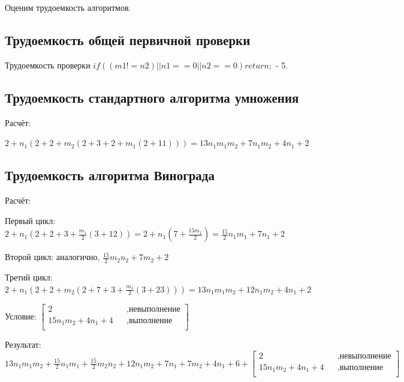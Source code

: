 \documentclass[12pt]{report}
\begin{document}
	Оценим трудоемкость алгоритмов.
	
	\subsection{Трудоемкость общей первичной проверки}
	Трудоемкость проверки $if ((m1 != n2) || n1 == 0 || n2 == 0) { return; }$   - 5.
	
	\subsection{Трудоемкость стандартного алгоритма умножения}
	Расчёт:\par
	$2 + n_1(2 + 2 + m_2(2 + 3 + 2 + m_1(2 + 11))) = 13n_1m_1m_2 + 7n_1m_2 + 4n_1 + 2$
	
	\subsection{Трудоемкость алгоритма Винограда}
	Расчёт:\par
	Первый цикл: $2 + n_1(2 + 2 + 3 + \frac{m_1}{2}(3 + 12)) = 2 + n_1(7 + \frac{15m_1}{2}) = \frac{15}{2}n_1m_1 + 7n_1 + 2$\par
	Второй цикл: аналогично, $\frac{15}{2}m_2n_2 + 7m_2 + 2$\par
	Третий цикл: $2 + n_1(2 + 2 + m_2(2 + 7 + 3 + \frac{m_1}{2}(3 + 23))) = 13 n_1m_1m_2 + 12n_1m_2 + 4n_1 + 2$\par
	Условие: 
	$\begin{bmatrix}
		2    &&, \text{невыполнение}\\
		15n_1m_2 + 4n_1 + 4 &&, \text{выполнение}\\
	\end{bmatrix} $ 	
	\par
	Результат: $ 13n_1m_1m_2 + \frac{15}{2}n_1m_1 + \frac{15}{2}m_2n_2 + 12n_1m_2 + 7n_1 + 7m_2 + 4n_1 + 6 + 
	\begin{bmatrix}
		2    &&, \text{невыполнение}\\
		15n_1m_2 + 4n_1 + 4 &&, \text{выполнение}\\
	\end{bmatrix} $
\end{document}
